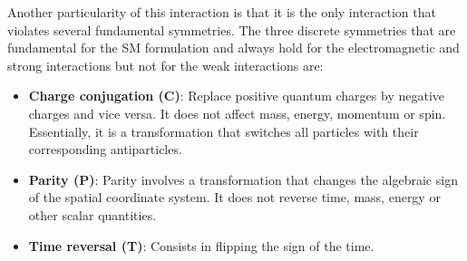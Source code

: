 Another particularity of this interaction is that it is the only interaction that violates several fundamental symmetries. 
The three discrete symmetries that are fundamental for the SM formulation and always hold for the
electromagnetic and strong interactions but not for the weak interactions are:
\begin{itemize}
	\item \textbf{Charge conjugation (C)}: Replace positive quantum charges by negative charges and vice versa. %
										It does not affect mass, energy, momentum or spin. Essentially, it is a 
										transformation that switches
										all particles with their corresponding antiparticles.
										 
	\item \textbf{Parity (P)}: Parity involves a transformation that changes the algebraic sign of the spatial coordinate system. 
								It does not reverse time, mass, energy or other scalar quantities.
	\item \textbf{Time reversal (T)}: Consists in flipping the sign of the time.
\end{itemize}

